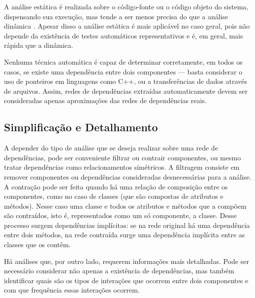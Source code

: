 \documentclass{article}
\begin{document}


A análise estática é realizada sobre o código-fonte ou o código objeto do sistema, dispensando sua execução, mas tende a ser menos precisa do que a análise dinâmica \cite{Landil1992}. Apesar disso a análise estática é mais aplicável no caso geral, pois não depende da existência de testes automáticos representativos e é, em geral, mais rápida que a dinâmica.

Nenhuma técnica automática é capaz de determinar corretamente, em todos os casos, se existe uma dependência entre dois componentes --- basta considerar o uso de ponteiros em linguagens como C++, ou a transferências de dados através de arquivos. Assim, redes de dependências extraídas automaticamente devem ser consideradas apenas aproximações das redes de dependências reais.

\subsection{Simplificação e Detalhamento}

A depender do tipo de análise que se deseja realizar sobre uma rede de dependências, pode ser conveniente filtrar ou contrair componentes, ou mesmo tratar dependências como relacionamentos simétricos. A filtragem consiste em remover componentes ou dependências consideradas desnecessárias para a análise. A contração pode ser feita quando há uma relação de composição entre os componentes, como no caso de classes (que são compostas de atributos e métodos). Nesse caso uma classe e todos os atributos e métodos que a compõem são contraídos, isto é, representados como um só componente, a classe. Desse processo surgem dependências implícitas: se na rede original há uma dependência entre dois métodos, na rede contraída surge uma dependência implícita entre as classes que os contêm. %

Há análises que, por outro lado, requerem informações mais detalhadas. Pode ser necessário considerar não apenas a existência de dependências, mas também identificar quais são os tipos de interações que ocorrem entre dois componentes e com que frequência essas interações ocorrem.
\end{document}
